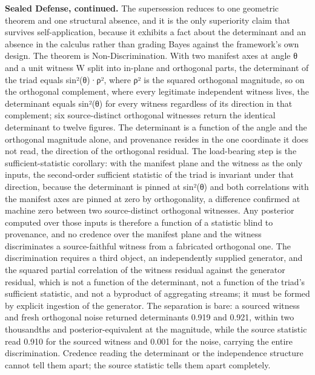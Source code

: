 \documentclass[10pt,twocolumn]{article}
\begin{document}
\textbf{Sealed Defense, continued.} The supersession reduces to one
geometric theorem and one structural absence, and it is the only
superiority claim that survives self-application, because it exhibits a
fact about the determinant and an absence in the calculus rather than
grading Bayes against the framework's own design. The theorem is
Non-Discrimination. With two manifest axes at angle θ and a unit witness
W split into in-plane and orthogonal parts, the determinant of the triad
equals sin²(θ)·ρ², where ρ² is the squared orthogonal magnitude, so on
the orthogonal complement, where every legitimate independent witness
lives, the determinant equals sin²(θ) for every witness regardless of
its direction in that complement; six source-distinct orthogonal
witnesses return the identical determinant to twelve figures. The
determinant is a function of the angle and the orthogonal magnitude
alone, and provenance resides in the one coordinate it does not read,
the direction of the orthogonal residual. The load-bearing step is the
sufficient-statistic corollary: with the manifest plane and the witness
as the only inputs, the second-order sufficient statistic of the triad
is invariant under that direction, because the determinant is pinned at
sin²(θ) and both correlations with the manifest axes are pinned at zero
by orthogonality, a difference confirmed at machine zero between two
source-distinct orthogonal witnesses. Any posterior computed over those
inputs is therefore a function of a statistic blind to provenance, and
no credence over the manifest plane and the witness discriminates a
source-faithful witness from a fabricated orthogonal one. The
discrimination requires a third object, an independently supplied
generator, and the squared partial correlation of the witness residual
against the generator residual, which is not a function of the
determinant, not a function of the triad's sufficient statistic, and not
a byproduct of aggregating streams; it must be formed by explicit
ingestion of the generator. The separation is bare: a sourced witness
and fresh orthogonal noise returned determinants 0.919 and 0.921, within
two thousandths and posterior-equivalent at the magnitude, while the
source statistic read 0.910 for the sourced witness and 0.001 for the
noise, carrying the entire discrimination. Credence reading the
determinant or the independence structure cannot tell them apart; the
source statistic tells them apart completely.
\end{document}
